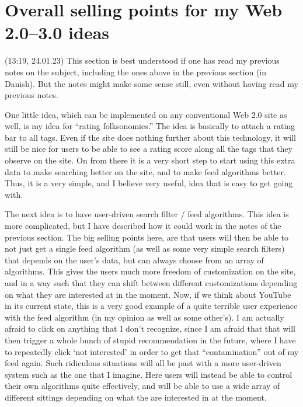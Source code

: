 \documentclass{report}
\begin{document}
\section{Overall selling points for my Web 2.0--3.0 ideas}

(13:19, 24.01.23) This section is best understood if one has read my previous notes on the subject, including the ones above in the previous section (in Danish). But the notes might make some sense still, even without having read my previous notes.


One little idea, which can be implemented on any conventional Web 2.0 site as well, is my idea for ``rating folksonomies.'' The idea is basically to attach a rating bar to all tags. Even if the site does nothing further about this technology, it will still be nice for users to be able to see a rating score along all the tags that they observe on the site. On from there it is a very short step to start using this extra data to make searching better on the site, and to make feed algorithms better. Thus, it is a very simple, and I believe very useful, idea that is easy to get going with.

The next idea is to have user-driven search filter / feed algorithms. This idea is more complicated, but I have described how it could work in the notes of the previous section. The big selling points here, are that users will then be able to not just get a single feed algorithm (as well as some very simple search filters) that depends on the user's data, but can always choose from an array of algorithms. This gives the users much more freedom of customization on the site, and in a way such that they can shift between different customizations depending on what they are interested at in the moment. Now, if we think about YouTube in its current state, this is a very good example of a quite terrible user experience with the feed algorithm (in my opinion as well as some other's). I am actually afraid to click on anything that I don't recognize, since I am afraid that that will then trigger a whole bunch of stupid recommendation in the future, where I have to repeatedly click `not interested' in order to get that ``contamination'' out of my feed again. Such ridiculous situations will all be past with a more user-driven system such as the one that I imagine. Here users will instead be able to control their own algorithms quite effectively, and will be able to use a wide array of different sittings depending on what the are interested in at the moment.
\end{document}
